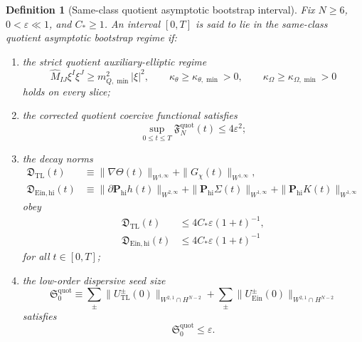 \documentclass[11pt]{article}
\newtheorem{definition}{Definition}
\begin{document}
\begin{definition}[Same-class quotient asymptotic bootstrap interval]
\label{def:asymboot}
Fix \(N\ge 6\), \(0<\varepsilon\ll 1\), and \(C_\ast\ge 1\). An interval \([0,T]\) is said to lie in the \emph{same-class quotient asymptotic bootstrap regime} if:
\begin{enumerate}
    \item the strict quotient auxiliary-elliptic regime
    \begin{equation}
    \widehat M_{IJ}\xi^I\xi^J\ge m_{Q,\min}^2|\xi|^2,
    \qquad
    \kappa_\theta\ge \kappa_{\theta,\min}>0,
    \qquad
    \kappa_\Omega\ge \kappa_{\Omega,\min}>0
    \label{eq:strict}
    \end{equation}
    holds on every slice;
    \item the corrected quotient coercive functional satisfies
    \begin{equation}
    \sup_{0\le t\le T}\mathfrak F_N^{\mathrm{quot}}(t)\le 4\varepsilon^2;
    \label{eq:Fboot}
    \end{equation}
    \item the decay norms
    \begin{align}
    \mathfrak D_{\mathrm{TL}}(t)
    &\equiv
    \|\nabla\Theta(t)\|_{W^{1,\infty}}
    +\|G_\chi(t)\|_{W^{1,\infty}},
    \label{eq:DTL}
    \\
    \mathfrak D_{\mathrm{Ein,hi}}(t)
    &\equiv
    \|\partial \mathbf P_{\mathrm{hi}}h(t)\|_{W^{2,\infty}}
    +\|\mathbf P_{\mathrm{hi}}\Sigma(t)\|_{W^{1,\infty}}
    +\|\mathbf P_{\mathrm{hi}}K(t)\|_{W^{1,\infty}}
    \label{eq:DEin}
    \end{align}
    obey
    \begin{align}
    \mathfrak D_{\mathrm{TL}}(t)
    &\le 4C_\ast\varepsilon(1+t)^{-1},
    \label{eq:DTLboot}
    \\
    \mathfrak D_{\mathrm{Ein,hi}}(t)
    &\le 4C_\ast\varepsilon(1+t)^{-1}
    \label{eq:DEinboot}
    \end{align}
    for all \(t\in[0,T]\);
    \item the low-order dispersive seed size
    \begin{equation}
    \mathfrak S_0^{\mathrm{quot}}
    \equiv
    \sum_{\pm}\|U_{\mathrm{TL}}^\pm(0)\|_{W^{2,1}\cap H^{N-2}}
    +\sum_{\pm}\|U_{\mathrm{Ein}}^\pm(0)\|_{W^{2,1}\cap H^{N-2}}
    \label{eq:S0}
    \end{equation}
    satisfies
    \begin{equation}
    \mathfrak S_0^{\mathrm{quot}}\le \varepsilon.
    \label{eq:S0small}
    \end{equation}
\end{enumerate}
\end{definition}
\end{document}
